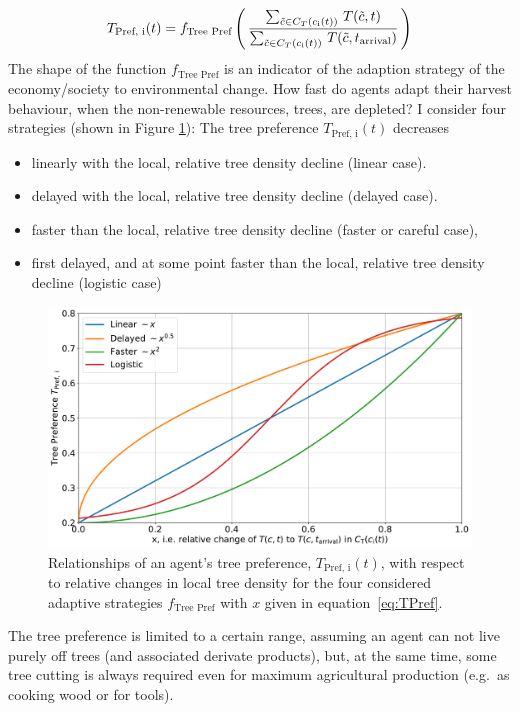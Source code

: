 \begin{equation}\label{eq:TPref}
T_\text{Pref, i}(t) = f_\text{Tree Pref}\left( \, \frac{\sum_{\tilde{c} \in C_{T}(c_{\rm i}(t)) } \, T(\tilde{c}, t)}{\sum_{\tilde{c} \in C_{T}(c_{\rm i}(t))} \, T(\tilde{c}, t_\text{arrival}) } \, \right)
\end{equation}
The shape of the function $f_\text{Tree Pref}$ is an indicator of the adaption strategy of the economy/society to environmental change. How fast do agents adapt their harvest behaviour, when the non-renewable resources, trees, are depleted?
I consider four strategies (shown in Figure \ref{fig:TPref_T}): The tree preference $T_\text{Pref, i}(t)$ decreases
\begin{itemize}
	\item linearly with the local, relative tree density decline (linear case).  
	\item delayed with the local, relative tree density decline (delayed case).
	\item faster than the local, relative tree density decline (faster or careful case),
	\item first delayed, and at some point faster than the local, relative tree density decline (logistic case) 
\end{itemize}
\begin{figure}
	\centering
	\includegraphics[width=\textwidth]{images/TPref}
	\caption{Relationships of an agent's tree preference, $T_\text{Pref, i}(t)$, with respect to relative changes in local tree density for the four considered adaptive strategies $f_\text{Tree Pref}$ with $x$ given in equation~\ref{eq:TPref}.}
	\label{fig:TPref_T}
\end{figure}
The tree preference is limited to a certain range, assuming an agent can not live purely off trees (and associated derivate products), but, at the same time, some tree cutting is always required even for maximum agricultural production (e.g.\ as cooking wood or for tools). 
